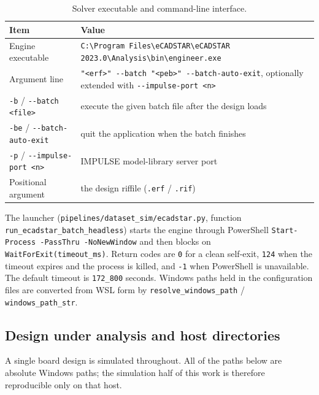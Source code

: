 \begin{table}[htbp]
\centering
\caption{Solver executable and command-line interface.}
\label{tab:appA_solver}
\begin{tabular}{p{} p{}}
\hline
Item & Value \\
\hline
Engine executable &
\texttt{C:\textbackslash{}Program Files\textbackslash{}eCADSTAR\textbackslash{}eCADSTAR
2023.0\textbackslash{}Analysis\textbackslash{}bin\textbackslash{}engineer.exe} \\
Argument line &
\texttt{"<erf>" -{}-batch "<peb>" -{}-batch-auto-exit}, optionally extended with
\texttt{-{}-impulse-port <n>} \\
\texttt{-b} / \texttt{-{}-batch <file>} & execute the given batch file after the design loads \\
\texttt{-be} / \texttt{-{}-batch-auto-exit} & quit the application when the batch finishes \\
\texttt{-p} / \texttt{-{}-impulse-port <n>} & IMPULSE model-library server port \\
Positional argument & the design riffile (\texttt{.erf} / \texttt{.rif}) \\
\hline
\end{tabular}
\end{table}

The launcher (\texttt{pipelines/\allowbreak{}dataset\_\allowbreak{}sim/\allowbreak{}ecadstar.py}, function
\texttt{run\_ecadstar\_batch\_headless}) starts the engine through PowerShell
\texttt{Start-Process -PassThru -NoNewWindow} and then blocks on \texttt{WaitForExit(timeout\_ms)}.
Return codes are \texttt{0} for a clean self-exit, \texttt{124} when the timeout expires and the
process is killed, and \texttt{-1} when PowerShell is unavailable. The default timeout is
\texttt{172\_800} seconds. Windows paths held in the configuration files are converted from WSL
form by \texttt{resolve\_windows\_path} / \texttt{windows\_path\_str}.

\subsection{Design under analysis and host directories}
\label{subsec:appA_design_paths}

A single board design is simulated throughout. All of the paths below are absolute Windows paths;
the simulation half of this work is therefore reproducible only on that host.

